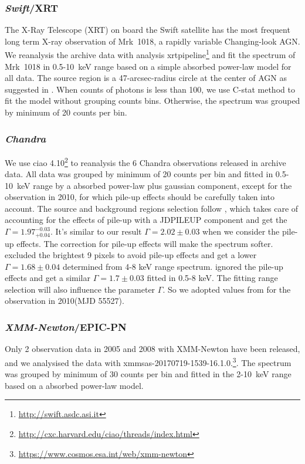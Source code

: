 \documentclass{aastex63}
\newcommand{\xmm}{{\em XMM-Newton}}
\newcommand{\chandra}{{\em Chandra}}
\newcommand{\swift}{{\em Swift}}
\begin{document}
\subsubsection{\swift/XRT}
The X-Ray Telescope (XRT) on board the Swift satellite has the most frequent long term X-ray observation of Mrk~1018, a rapidly variable Changing-look AGN. We reanalysis the archive data with analysis xrtpipeline\footnote{\url{http://swift.asdc.asi.it}} and fit the spectrum of Mrk~1018 in 0.5-10~keV range based on a simple absorbed power-law model for all data.  The source region is a 47-arcsec-radius circle at the center of AGN as suggested in \citet{2009MNRAS.397.1177E}. When counts of photons is less than 100, we use C-stat method to fit the model without grouping counts bins. Otherwise, the spectrum was grouped by minimum of 20 counts per bin. 


\subsubsection{\chandra}
We use ciao 4.10\footnote{\url{http://cxc.harvard.edu/ciao/threads/index.html}} to reanalysis the 6 Chandra observations released in archive data. All data was grouped by minimum of 20 counts per bin and fitted in 0.5-10~keV range by a absorbed power-law plus gaussian component, except for the observation in 2010, for which pile-up effects should be carefully taken into account. The source and background regions selection follow \citet{2017ApJ...840...11L}, which takes care of accounting for the effects of pile-up with a JDPILEUP component and get the  $\Gamma =1.97_{+0.04}^{-0.03}$. It's similar to our result $\Gamma =2.02\pm{0.03}$ when we consider the pile-up effects. The correction for pile-up effects will make the spectrum softer. \citet{2016A&A...593L...9H} excluded the brightest 9 pixels to avoid pile-up effects and get a lower $\Gamma =1.68\pm0.04$ determined from 4-8 keV range spectrum. \citet{2017A&A...607L...9K} ignored the pile-up effects and get a similar $\Gamma =1.7\pm0.03$ fitted in 0.5-8 keV. The fitting range selection will also influence the parameter $\Gamma$. So we adopted values from \citet{2017A&A...607L...9K} for the observation in 2010(MJD 55527).

\subsubsection{\xmm/EPIC-PN}
Only 2 observation data in 2005 and 2008 with XMM-Newton have been released, and we analysised the data with xmmsas-20170719-1539-16.1.0.\footnote{\url{https://www.cosmos.esa.int/web/xmm-newton}}. The spectrum was grouped by minimum of 30 counts per bin and fitted in the 2-10~keV range based on a absorbed power-law model. 
\end{document}
